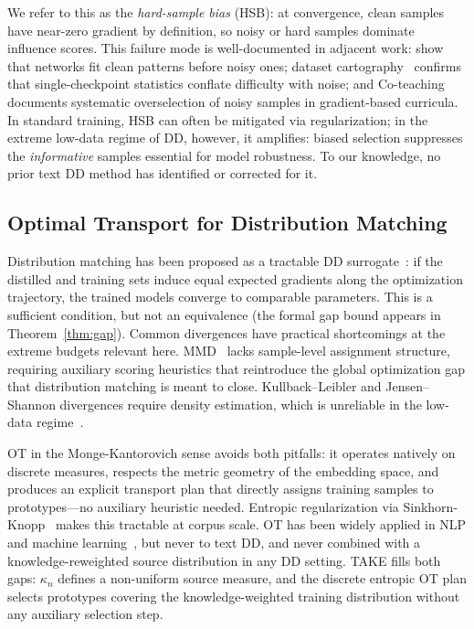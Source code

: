\begin{foldable} %
  We refer to this as the \emph{hard-sample bias} (HSB): at convergence, clean samples have near-zero gradient by definition, so noisy or hard samples dominate influence scores.
  This failure mode is well-documented in adjacent work: \cite{arpit2017closer} show that networks fit clean patterns before noisy ones; dataset cartography~\cite{swayamdipta2020dataset} confirms that single-checkpoint statistics conflate difficulty with noise; and Co-teaching~\cite{han2018co} documents systematic overselection of noisy samples in gradient-based curricula.
  In standard training, HSB can often be mitigated via regularization; in the extreme low-data regime of DD, however, it amplifies: biased selection suppresses the \emph{informative} samples essential for model robustness.
  To our knowledge, no prior text DD method has identified or corrected for it.
\end{foldable}

\subsection{Optimal Transport for Distribution Matching} \label{sec:02-related-ot}
\begin{foldable} %
  Distribution matching has been proposed as a tractable DD surrogate~\cite{zhao2023dataset}: if the distilled and training sets induce equal expected gradients along the optimization trajectory, the trained models converge to comparable parameters.
  This is a sufficient condition, but not an equivalence (the formal gap bound appears in Theorem~\ref{thm:gap}).
  Common divergences have practical shortcomings at the extreme budgets relevant here.
  MMD~\cite{gretton2012kernel} lacks sample-level assignment structure, requiring auxiliary scoring heuristics that reintroduce the global optimization gap that distribution matching is meant to close.
  Kullback--Leibler and Jensen--Shannon divergences require density estimation, which is unreliable in the low-data regime~\cite{paninski2003estimation}.
\end{foldable}

\begin{foldable} %
  OT in the Monge-Kantorovich sense avoids both pitfalls: it operates natively on discrete measures, respects the metric geometry of the embedding space, and produces an explicit transport plan that directly assigns training samples to prototypes---no auxiliary heuristic needed.
  Entropic regularization via Sinkhorn-Knopp~\cite{cuturi2013sinkhorn} makes this tractable at corpus scale.
  OT has been widely applied in NLP and machine learning~\cite{kusner2015word,tolstikhin2018wasserstein,courty2016optimal,arjovsky2017wasserstein}, but never to text DD, and never combined with a knowledge-reweighted source distribution in any DD setting.
  TAKE fills both gaps: $\kappa_n$ defines a non-uniform source measure, and the discrete entropic OT plan selects prototypes covering the knowledge-weighted training distribution without any auxiliary selection step.
\end{foldable}
